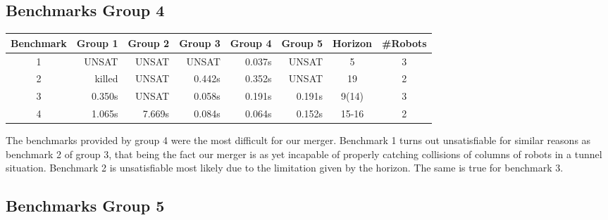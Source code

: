 \documentclass{llncs}
\begin{document}
\subsection{ Benchmarks Group 4}

\begin{table}[]
\begin{tabular}{|c|r|r|r|r|r|c|c|}
\hline
\multicolumn{1}{|l|}{Benchmark} & \multicolumn{1}{l|}{Group 1} & \multicolumn{1}{l|}{Group 2} & \multicolumn{1}{l|}{Group 3} & \multicolumn{1}{l|}{Group 4} & \multicolumn{1}{l|}{Group 5} & Horizon & \multicolumn{1}{l|}{\#Robots} \\ \hline
1                               & UNSAT                        & UNSAT                        & UNSAT                        & 0.037s                       & UNSAT                        & 5       & 3                             \\ \hline
2                               & killed                       & UNSAT                        & 0.442s                       & 0.352s                       & UNSAT                        & 19      & 2                             \\ \hline
3                               & 0.350s                       & UNSAT                        & 0.058s                       & 0.191s                       & 0.191s                       & 9(14)    & 3                             \\ \hline
4                               & 1.065s                       & 7.669s                       & 0.084s                       & 0.064s                       & 0.152s                       & 15-16   & 2                             \\ \hline
\end{tabular}
\end{table}
The benchmarks provided by group 4 were the most difficult for our merger. Benchmark 1 turns out unsatisfiable for similar reasons as benchmark 2 of group 3, that being the fact our merger is as yet incapable of properly catching collisions of columns of robots in a tunnel situation. Benchmark 2 is unsatisfiable most likely due to the limitation given by the horizon. The same is true for benchmark 3.

\subsection{ Benchmarks Group 5}
\end{document}
